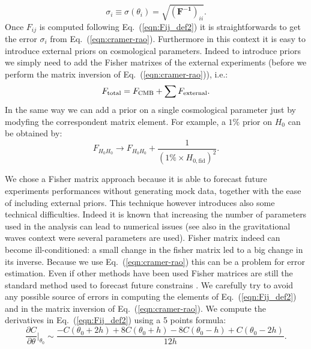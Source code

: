 \documentclass[aps,prd,reprint,superscriptaddress]{revtex4-1}
\newcommand\refeq[1]{Eq.~(\ref{eqn:#1})}
\begin{document}
\begin{equation}
\sigma_i \equiv \sigma (\theta_i) = \sqrt{(\mathbf{ F^{-1}})_{ii}}.
\label{eqn:cramer-rao}
\end{equation}
Once $F_{ij}$ is computed following \refeq{Fij_def2} it is straightforwards to get the error $\sigma_i$ from \refeq{cramer-rao}. Furthermore in this context it is easy to introduce external priors on cosmological parameters.
Indeed to introduce priors we simply need to add the Fisher matrixes of the external experiments (before we perform the matrix inversion of \refeq{cramer-rao}), i.e.:
\begin{equation}
F_{\rm total}=F_{\rm CMB}+\sum F_{\rm external}.
\end{equation}
In the same way we can add a prior on a single cosmological parameter just by modyfing the correspondent matrix element.
For example, a $1\%$ prior on $H_{0}$ can be obtained by:
\begin{equation}
F_{H_0 H_0} \rightarrow F_{H_0 H_0} + \frac{1}{(1\% \times H_{0,\text{fid}})^2}.
\end{equation}


We chose a Fisher matrix approach because it is able to forecast future experiments performances without generating mock data, together with the ease of including external priors. 
This technique however introduces also some technical difficulties. 
Indeed it is known \cite{2006astro.ph..9591A} that increasing the number of parameters used in the analysis can lead to numerical issues (see also \cite{2008PhRvD..77d2001V} in the gravitational waves context were several parameters are used).
Fisher matrix indeed can become ill-conditioned: a small change in the fisher matrix led to a big change in its inverse. Because we use \refeq{cramer-rao} this can be a problem for error estimation. 
Even if other methods have been used \cite{2006JCAP...10..013P,2006astro.ph..9591A} Fisher matrices are still the standard method used to forecast future constrains \cite{wu:2014}.
We carefully try to avoid any possible source of errors in computing the elements of \refeq{Fij_def2} and in the matrix inversion of \refeq{cramer-rao}.
We compute the derivatives in \refeq{Fij_def2} using a 5 points formula:
\begin{equation}
\frac{\partial C}{\partial \theta}\bigg|_{\theta_{0}} \sim \frac{-C(\theta_{0}+2h)+8C(\theta_{0}+h)-8C(\theta_{0}-h)+C(\theta_{0}-2h)}{12h}.
\label{eqn:deriv}
\end{equation}
\end{document}
